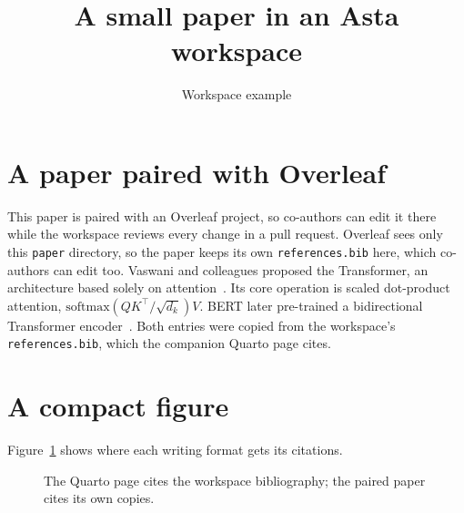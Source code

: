 \documentclass[11pt]{article}
\title{A small paper in an Asta workspace}
\author{Workspace example}
\date{}
\begin{document}
\maketitle

\section{A paper paired with Overleaf}
This paper is paired with an Overleaf project, so co-authors can edit it there while the workspace reviews every change in a pull request. Overleaf sees only this \texttt{paper} directory, so the paper keeps its own \texttt{references.bib} here, which co-authors can edit too. Vaswani and colleagues proposed the Transformer, an architecture based solely on attention~\cite{vaswani2017attention}. Its core operation is scaled dot-product attention, $\mathrm{softmax}(QK^\top/\sqrt{d_k})V$. BERT later pre-trained a bidirectional Transformer encoder~\cite{devlin2019bert}. Both entries were copied from the workspace's \texttt{references.bib}, which the companion Quarto page cites.

\section{A compact figure}
Figure~\ref{fig:workspace} shows where each writing format gets its citations.
\begin{figure}[htbp]
  \centering
  \caption{The Quarto page cites the workspace bibliography; the paired paper cites its own copies.}
  \label{fig:workspace}
\end{figure}



\end{document}
